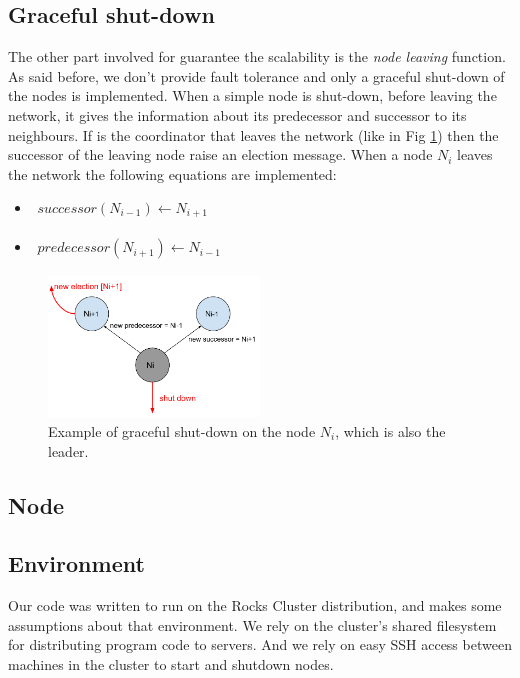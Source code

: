 \documentclass[11pt,conference]{IEEEtran}
\begin{document}
\subsection{Graceful shut-down}
\label{chap:graceful}
The other part involved for guarantee the scalability is the \textit{node leaving} function. As said before, we don't provide fault tolerance and only a graceful shut-down of the nodes is implemented. When a simple node is shut-down, before leaving the network, it gives the information about its predecessor and successor to its neighbours. If is the coordinator that leaves the network (like in Fig \ref{fig:graceful}) then the successor of the leaving node raise an election message.
\newline
When a node $N_i$ leaves the network the following equations are implemented:
\begin{itemize}
\item[] $\begin{aligned}
    successor(N_{i-1}) \leftarrow N_{i+1}
\end{aligned}$
\item[] $\begin{aligned}
    predecessor(N_{i+1}) \leftarrow N_{i-1}
\end{aligned}$
\end{itemize}


\begin{figure}[h!]
  \centering
    \includegraphics[width=0.5\textwidth]{graceful}
    \caption{Example of graceful shut-down on the node $N_i$, which is also the leader.}
    \label{fig:graceful}
\end{figure}

\subsection{Node}



\subsection{Environment}
Our code was written to run on the Rocks Cluster distribution\cite{rocks}, and
makes some assumptions about that environment. We rely on the cluster's shared
filesystem for distributing program code to servers. And we rely on easy SSH
access between machines in the cluster to start and shutdown nodes.
\end{document}
